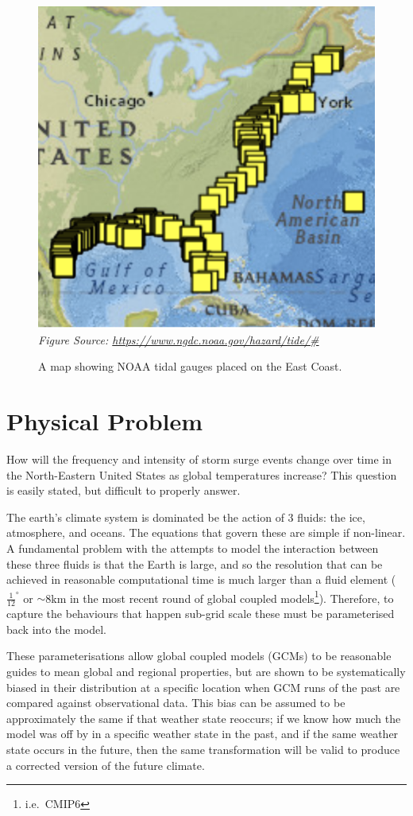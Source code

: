 \documentclass[usenames, dvipsnames, twocolumn]{article}
\begin{document}
\begin{figure}[htb!]
    \centering
    \includegraphics[width=0.8\linewidth]{images/proposal/TidalGaugesUS.png}\\
    \textit{Figure Source: \url{https://www.ngdc.noaa.gov/hazard/tide/#}}
    \caption{A map showing NOAA tidal gauges placed on the East Coast.}
    \label{fig:tidal}
\end{figure}
\section{Physical Problem}


How will the frequency and intensity of storm surge events change over time
 in the North-Eastern United States as global temperatures increase?
  This question is easily stated, but difficult to properly answer.

The earth’s climate system is dominated be the action of 3 fluids: the ice,
 atmosphere, and oceans. The equations that govern these are simple if non-linear.
  A fundamental problem with the attempts to model the interaction between these
   three fluids is that the Earth is large, and so the resolution that can be
    achieved in reasonable computational time is much larger than a fluid element
      (\(\frac{1}{12}^{\circ}\) or \(\sim\)8km in the most recent round of global
       coupled models\footnote{i.e.\ CMIP6}). Therefore, to capture the behaviours
        that happen sub-grid scale these must be parameterised back into the model.~\cite{powell2003reduced}

These parameterisations allow global coupled models (GCMs) to be reasonable guides to mean global and regional properties, but are shown to be systematically biased in their distribution at a specific location when GCM runs of the past are compared against observational data. This bias can be assumed to be approximately the same if that weather state reoccurs; if we know how much the model was off by in a specific weather state in the past, and if the same weather state occurs in the future, then the same transformation will be valid to produce a corrected version of the future climate.
\end{document}
